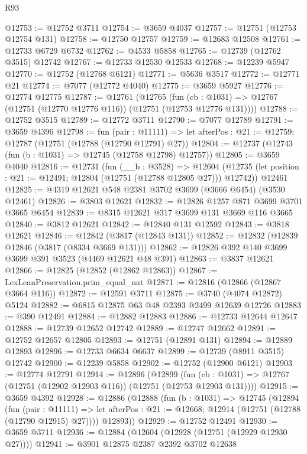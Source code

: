 \begin{lexlean}{R93}
\begin{coremodule}
@12753 := @12752 @3711
@12754 := @3659 @4037
@12757 := @12751 (@12753 @12754 @131)
@12758 := @12750 @12757
@12759 := @12683 @12508
@12761 := @12733 @6729 @6732
@12762 := @4533 @5858
@12765 := @12739 (@12762 @3515) @12742
@12767 := @12733 @12530 @12533
@12768 := @12239 @5947
@12770 := @12752 (@12768 @6121)
@12771 := @5636 @3517
@12772 := @12771 @21
@12774 := @7077 (@12772 @4040)
@12775 := @3659 @5927
@12776 := @12774 @12775
@12787 := @12761
    (@12765
      (fun (cb : @1031) => @12767 (@12751 (@12770 @12776 @116)) (@12751 (@12753 @12776 @131))))
@12788 := @12752 @3515
@12789 := @12772 @3711
@12790 := @7077 @12789
@12791 := @3659 @4396
@12798 := fun (pair : @11111) =>
  let afterPos : @21 := @12759; @12787 (@12751 (@12788 (@12790 @12791) @27))
@12804 := @12737 (@12743 (fun (b : @1031) => @12745 (@12758 @12798) @12757))
@12805 := @3659 @4040
@12816 := @12731
    (fun (__b : @3528) =>
    @12604 (@12735 (let position : @21 := @12491; @12804 (@12751 (@12788 @12805 @27))) @12742))
    @12461
@12825 := @4319 @12621 @548 @2381 @3702 @3699 (@3666 @6454) (@3530 @12461)
@12826 := @3803 @12621
@12832 := @12826 @1257 @871 @3699 @3701 @3665 @6454
@12839 := @8315 @12621 @317 @3699 @131 @3669 @116 @3665
@12840 := @3812 @12621
@12842 := @12840 @131 @12592
@12843 := @3818 @12621
@12846 := @12842 (@3817 (@12843 @131))
@12852 := @12832 (@12839 @12846 (@3817 (@8334 @3669 @131)))
@12862 := @12826 @392 @140 @3699 @3699 @391 @3523 (@4469 @12621 @48 @391)
@12863 := @3837 @12621
@12866 := @12825 (@12852 (@12862 @12863))
@12867 := LexLeanPreservation.prim_equal_nat
@12871 := @12816 (@12866 (@12867 @3664 @116))
@12872 := @12591 @3711
@12875 := @3740 (@4074 @12872) @5124
@12882 := @6815 @12875 @63 @48 @2393 @2499 @12639 @12726
@12883 := @390 @12491
@12884 := @12882 @12883
@12886 := @12733 @12644 @12647
@12888 := @12739 @12652 @12742
@12889 := @12747 @12662
@12891 := @12752 @12657 @12805
@12893 := @12751 (@12891 @131)
@12894 := @12889 @12893
@12896 := @12733 @6634 @6637
@12899 := @12739 (@8911 @3515) @12742
@12900 := @12239 @5858
@12902 := @12752 (@12900 @6121)
@12903 := @12774 @12791
@12914 := @12896
    (@12899
      (fun (cb : @1031) => @12767 (@12751 (@12902 @12903 @116)) (@12751 (@12753 @12903 @131))))
@12915 := @3659 @4392
@12928 := @12886
    (@12888
      (fun (b : @1031) =>
      @12745
        (@12894
          (fun (pair : @11111) =>
          let afterPos : @21 := @12668; @12914 (@12751 (@12788 (@12790 @12915) @27))))
        @12893))
@12929 := @12752 @12491
@12930 := @3659 @3711
@12936 := @12884 (@12604 (@12928 (@12751 (@12929 @12930 @27))))
@12941 := @3901 @12875 @2387 @2392 @3702 @12638

\end{coremodule}
\end{lexlean}
